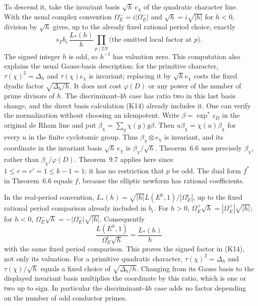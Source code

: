 To descend it, take the invariant basis $\sqrt h\,e_\chi$ of the
quadratic character line. With the usual complex convention
$\Omega_E^-=i|\Omega_E^-|$ and $\sqrt h=i\sqrt{|h|}$ for $h<0$,
division by $\sqrt h$ gives, up to the already fixed rational
period choice, exactly
\[
             s_F b_\epsilon\,\frac{L_*(h)}{h}
       \prod_{p\mid 2N}\text{(the omitted local factor at $p$)}.
                                                               \tag{K14}
\]
The signed integer $h$ is odd, so $h^{-1}$ has valuation zero.
This computation also explains the usual Gauss-basis description:
for the primitive character, $\tau(\chi)^2=\Delta_h$ and
$\tau(\chi)e_\chi$ is invariant; replacing it by $\sqrt h e_\chi$
costs the fixed dyadic factor $\sqrt{\Delta_h/h}$. It does not cost
$\varphi(D)$ or any power of the number of prime divisors of $h$.
The discriminant-$4h$ case has ratio two in this last basis change,
and the direct basis calculation (K14) already includes it.
One can verify the normalization without choosing an idempotent.
Write $\beta=\exp^*z_D$ in the original de Rham line and put
$\beta_\chi=\sum_g\chi(g)g\beta$. Then
$u\beta_\chi=\chi(u)\beta_\chi$ for every $u$ in the finite
cyclotomic group. Thus $\beta_\chi\otimes e_\chi$ is invariant,
and its coordinate in the invariant basis
$\sqrt h\,e_\chi$ is $\beta_\chi/\sqrt h$.
Theorem~6.6 uses precisely $\beta_\chi$, rather than
$\beta_\chi/\varphi(D)$. Theorem~9.7 applies here since
$1\le r=r'=1\le k-1=1$; it has no restriction that $p$ be odd.
The dual form $f^*$ in Theorem~6.6 equals $f$, because the elliptic
newform has rational coefficients.

In the real-period convention,
$L_*(h)=\sqrt{|h|}L(E^h,1)/|\Omega_E^\epsilon|$, up to the
fixed rational period comparison already included in $b_\epsilon$.
For $h>0$,
$\Omega_E^+\sqrt h=|\Omega_E^+|\sqrt{|h|}$; for $h<0$,
$\Omega_E^-\sqrt h=-|\Omega_E^-|\sqrt{|h|}$.
Consequently
\[
 \frac{L(E^h,1)}{\Omega_E^\epsilon\sqrt h}
     =\frac{L_*(h)}{h}
\]
with the same fixed period comparison. This proves the signed
factor in (K14), not only its valuation. For a primitive quadratic
character, $\tau(\chi)^2=\Delta_h$ and
$\tau(\chi)/\sqrt h$ equals a fixed choice of
$\sqrt{\Delta_h/h}$. Changing from its Gauss basis to the displayed
invariant basis multiplies the coordinate by this ratio, which
is one or two up to sign. In particular the discriminant-$4h$
case adds no factor depending on the number of odd conductor primes.


